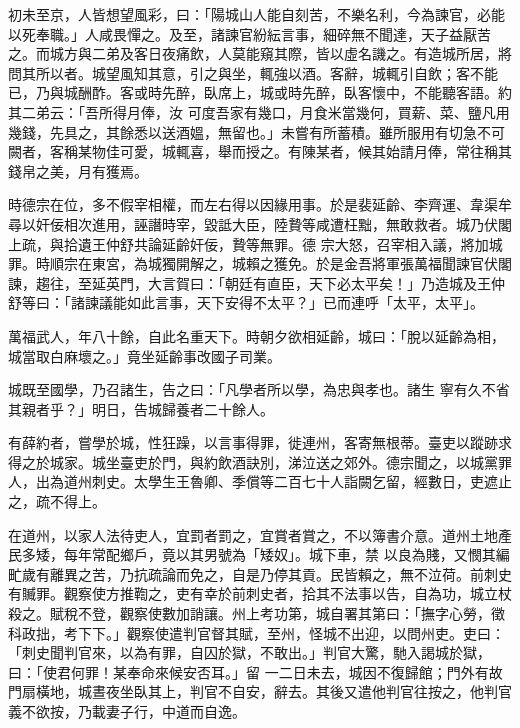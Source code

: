 \begin{pinyinscope}
 初未至京，人皆想望風彩，曰：「陽城山人能自刻苦，不樂名利，今為諫官，必能以死奉職。」人咸畏憚之。及至，諸諫官紛紜言事，細碎無不聞達，天子益厭苦之。而城方與二弟及客日夜痛飲，人莫能窺其際，皆以虛名譏之。有造城所居，將問其所以者。城望風知其意，引之與坐，輒強以酒。客辭，城輒引自飲；客不能已，乃與城酬酢。客或時先醉，臥席上，城或時先醉，臥客懷中，不能聽客語。約其二弟云：「吾所得月俸，汝
 可度吾家有幾口，月食米當幾何，買薪、菜、鹽凡用幾錢，先具之，其餘悉以送酒媼，無留也。」未嘗有所蓄積。雖所服用有切急不可闕者，客稱某物佳可愛，城輒喜，舉而授之。有陳某者，候其始請月俸，常往稱其錢帛之美，月有獲焉。



 時德宗在位，多不假宰相權，而左右得以因緣用事。於是裴延齡、李齊運、韋渠牟尋以奸佞相次進用，誣譖時宰，毀詆大臣，陸贄等咸遭枉黜，無敢救者。城乃伏閣上疏，與拾遺王仲舒共論延齡奸佞，贄等無罪。德
 宗大怒，召宰相入議，將加城罪。時順宗在東宮，為城獨開解之，城賴之獲免。於是金吾將軍張萬福聞諫官伏閣諫，趨往，至延英門，大言賀曰：「朝廷有直臣，天下必太平矣！」乃造城及王仲舒等曰：「諸諫議能如此言事，天下安得不太平？」已而連呼「太平，太平」。



 萬福武人，年八十餘，自此名重天下。時朝夕欲相延齡，城曰：「脫以延齡為相，城當取白麻壞之。」竟坐延齡事改國子司業。



 城既至國學，乃召諸生，告之曰：「凡學者所以學，為忠與孝也。諸生
 寧有久不省其親者乎？」明日，告城歸養者二十餘人。



 有薛約者，嘗學於城，性狂躁，以言事得罪，徙連州，客寄無根蒂。臺吏以蹤跡求得之於城家。城坐臺吏於門，與約飲酒訣別，涕泣送之郊外。德宗聞之，以城黨罪人，出為道州刺史。太學生王魯卿、季償等二百七十人詣闕乞留，經數日，吏遮止之，疏不得上。



 在道州，以家人法待吏人，宜罰者罰之，宜賞者賞之，不以簿書介意。道州土地產民多矮，每年常配鄉戶，竟以其男號為「矮奴」。城下車，禁
 以良為賤，又憫其編甿歲有離異之苦，乃抗疏論而免之，自是乃停其貢。民皆賴之，無不泣荷。前刺史有贓罪。觀察使方推鞫之，吏有幸於前刺史者，拾其不法事以告，自為功，城立杖殺之。賦稅不登，觀察使數加誚讓。州上考功第，城自署其第曰：「撫字心勞，徵科政拙，考下下。」觀察使遣判官督其賦，至州，怪城不出迎，以問州吏。吏曰：「刺史聞判官來，以為有罪，自囚於獄，不敢出。」判官大驚，馳入謁城於獄，曰：「使君何罪！某奉命來候安否耳。」留
 一二日未去，城因不復歸館；門外有故門扇橫地，城晝夜坐臥其上，判官不自安，辭去。其後又遣他判官往按之，他判官義不欲按，乃載妻子行，中道而自逸。




\end{pinyinscope}
